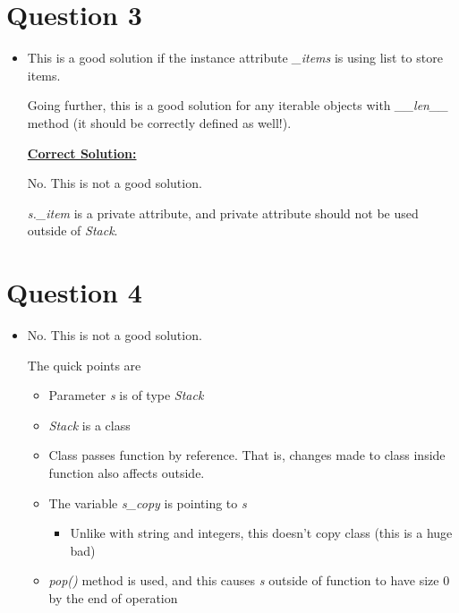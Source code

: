 \documentclass[12pt]{article}
\begin{document}
\section*{Question 3}
\begin{itemize}
    \item

    This is a good solution if the instance attribute \textit{\_items}
    is using list to store items.

    \bigskip

    Going further, this is a good solution for any iterable objects with
    \textit{\_\_len\_\_} method (it should be correctly defined as well!).


    \begin{mdframed}
        \underline{\textbf{Correct Solution:}}

        \bigskip
        \color{red}
        No. This is not a good solution.

        \bigskip

        \textit{s.\_item} is a private attribute, and private attribute should
        not be used outside of \textit{Stack}.

        \color{black}
    \end{mdframed}
\end{itemize}

\section*{Question 4}
\begin{itemize}
    \item

    No. This is not a good solution.

    \bigskip

    The quick points are

    \begin{itemize}
        \item Parameter \textit{s} is of type \textit{Stack}
        \item \textit{Stack} is a class
        \item Class passes function by reference. That is, changes made to class
        inside function also affects outside.
        \item The variable \textit{s\_copy} is pointing to \textit{s}
        \begin{itemize}
            \item Unlike with string and integers, this doesn't copy class (this is a huge bad)
        \end{itemize}
        \item \textit{pop()} method is used, and this causes \textit{s} outside of
        function to have size 0 by the end of operation
    \end{itemize}
\end{itemize}
\end{document}
